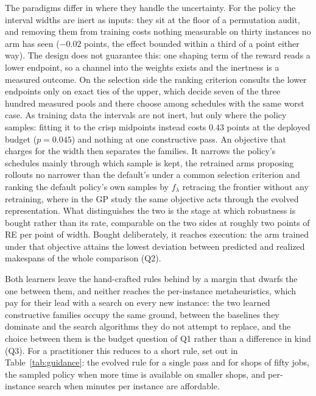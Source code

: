 \documentclass[preprint,authoryear,12pt]{elsarticle}
\theoremstyle{definition}
\theoremstyle{remark}
\begin{document}
The paradigms differ in where they handle the uncertainty. For the
policy the interval widths are inert as inputs: they sit at the floor
of a permutation audit, and removing them from training costs nothing
measurable on thirty instances no arm has seen ($-0.02$ points, the
effect bounded within a third of a point either way). The design
does not guarantee this: one shaping term of the reward reads a
lower endpoint, so a channel into the weights exists and the
inertness is a measured outcome. On the selection side the ranking
criterion consults the lower endpoints only on exact ties of the
upper, which decide seven of the three hundred measured pools and
there choose among schedules with the same worst case. As training
data the intervals are not inert, but only where the policy samples:
fitting it to the crisp midpoints instead costs $0.43$ points at the
deployed budget ($p=0.045$) and nothing at one constructive pass. An
objective that charges for the width then separates the families. It
narrows the policy's schedules mainly through which sample is kept,
the retrained arms proposing rollouts no narrower than the default's
under a common selection criterion and ranking the default policy's
own samples by $f_\lambda$ retracing the frontier without any
retraining, where in the GP study the same objective acts through the
evolved representation. What distinguishes the two is the stage at which
robustness is bought rather than its rate, comparable on the two
sides at roughly two points of RE per point of width. Bought
deliberately, it reaches execution: the arm trained under that
objective attains the lowest deviation between predicted and realized
makespans of the whole comparison (Q2).

Both learners leave the hand-crafted rules behind by a margin that
dwarfs the one between them, and neither reaches the per-instance
metaheuristics, which pay for their lead with a search on every new
instance: the two learned constructive families occupy the same
ground, between the baselines they dominate and the search algorithms
they do not attempt to replace, and the choice between them is the
budget question of Q1 rather than a difference in kind (Q3). For a
practitioner this reduces to a short rule, set out in
Table~\ref{tab:guidance}: the evolved rule for a single pass and for
shops of fifty jobs, the sampled policy when more time is available on
smaller shops, and per-instance search when minutes per instance are
affordable.
\end{document}
